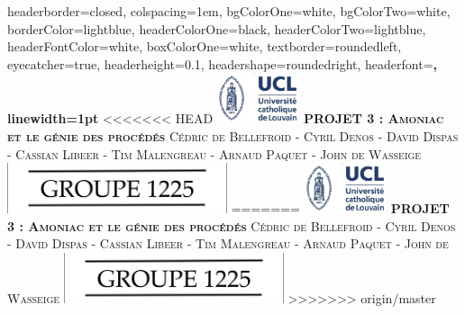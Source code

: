 \documentclass[landscape,a0paper,fontscale=0.285]{baposter} %
\begin{document}
\begin{poster}
{
headerborder=closed, %
colspacing=1em, %
bgColorOne=white, %
bgColorTwo=white, %
borderColor=lightblue, %
headerColorOne=black, %
headerColorTwo=lightblue, %
headerFontColor=white, %
boxColorOne=white, %
textborder=roundedleft, %
eyecatcher=true, %
headerheight=0.1\textheight, %
headershape=roundedright, %
headerfont=\Large\bf\textsc, %
linewidth=1pt %
}
%
<<<<<<< HEAD
{\includegraphics[height=4em]{UCL.jpg}} %
{\bf\textsc{PROJET 3 : Amoniac et le g\'enie des proc\'ed\'es}\vspace{0.5em}} %
{\textsc{\small Cédric de Bellefroid - Cyril Denos - David Dispas  - Cassian Libeer  - Tim Malengreau - Arnaud Paquet - John de Wasseige}} %
{\includegraphics[height=4em]{groupe.png}} %
=======
{\includegraphics[height=4em]{UCL.jpg}} 
{\bf\textsc{PROJET 3 : Amoniac et le g\'enie des proc\'ed\'es}\vspace{0.5em}} 
{\textsc{\small Cédric de Bellefroid - Cyril Denos - David Dispas  - Cassian Libeer  - Tim Malengreau - Arnaud Paquet - John de Wasseige}} 
{\includegraphics[height=4em]{groupe.png}} 
>>>>>>> origin/master


\end{poster}
\end{document}
